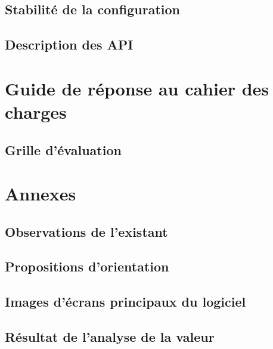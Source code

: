 \subsection{Stabilité de la configuration}
\subsection{Description des API}

\section{Guide de réponse au cahier des charges}
\subsection{Grille d'évaluation}

\section{Annexes}
\subsection{Observations de l'existant}
\subsection{Propositions d'orientation}
\subsection{Images d'écrans principaux du logiciel}
\subsection{Résultat de l'analyse de la valeur}